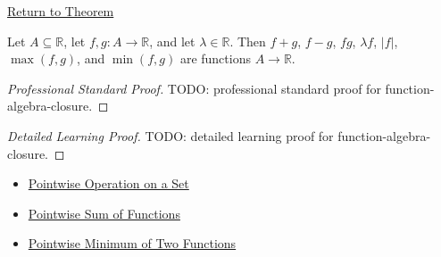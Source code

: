 \newpage
{}
\label{prf:function-algebra-closure}

\begin{remark*}[Return]
\hyperref[thm:function-algebra-closure]{Return to Theorem}
\end{remark*}

\begin{theorem*}
Let \(A\subseteq\mathbb{R}\), let \(f,g:A\to\mathbb{R}\), and let
\(\lambda\in\mathbb{R}\).  Then \(f+g\), \(f-g\), \(fg\), \(\lambda f\),
\(|f|\), \(\max(f,g)\), and \(\min(f,g)\) are functions \(A\to\mathbb{R}\).
\end{theorem*}

\begin{proof}[Professional Standard Proof]
\LRAProofBodyStart
TODO: professional standard proof for function-algebra-closure.
\end{proof}

\begin{proof}[Detailed Learning Proof]
\LRAProofBodyStart
TODO: detailed learning proof for function-algebra-closure.
\end{proof}

\begin{remark*}
\end{remark*}

\begin{dependencies}
\begin{itemize}
  \item \hyperref[def:pointwise-operation-on-set]{Pointwise Operation on a Set}
  \item \hyperref[def:pointwise-sum-of-functions]{Pointwise Sum of Functions}
  \item \hyperref[def:pointwise-minimum-of-two-functions]{Pointwise Minimum of Two Functions}
\end{itemize}
\end{dependencies}

\clearpage
